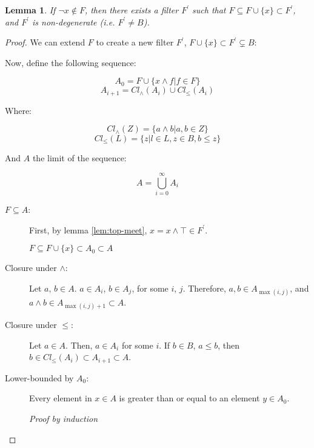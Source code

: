 \documentclass[notitlepage,a4paper]{article}
\newtheorem{lemma}{Lemma}
\begin{document}
\begin{enumerate}
\begin{lemma}
       If $¬x \not \in F$, then there exists a
       filter $F^\prime$ such that $F \subseteq F \cup \{x\} \subset F^\prime$,
       and $F^\prime$ is non-degenerate (i.e. $F^\prime \neq B$).
       
    \end{lemma}
    \begin{proof}
           We can extend $F$ to create a new filter $F^\prime$,
           $F \cup \{x\} \subset F^\prime \subsetneq B$:
           
           Now, define the following sequence:

           $$A_0 = F \cup \{ x ∧ f | f ∈ F \}$$
           $$A_{i+1} = Cl_{∧}(A_i) \cup Cl_{≤}(A_i)$$

           Where:

           $$Cl_{∧}(Z) = \{ a ∧ b  \vert a, b \in Z \}$$
           $$Cl_{≤}(L) = \{ z \vert l \in L, z \in B, b ≤ z \}$$

           And $A$ the limit of the sequence:

           $$A = \bigcup_{i=0}^{\infty} A_i$$

           \begin{description}
             \item[$F \subseteq A$:]

               First, by lemma \ref{lem:top-meet}, $x = x ∧ ⊤ ∈ F^\prime$.

               $F \subseteq F \cup \{x\} \subset A_0 \subset A$
               
             \item[Closure under $∧$:]

               Let $a,\,b \in A$. $a \in A_i$, $b \in A_j$, for some
               $i$, $j$. Therefore,
               $a,b \in A_{\max(i,j)}$, and $a ∧ b \in A_{\max(i,j)+1} \subset A$.

             \item[Closure under $≤$:]
               
               Let $a \in A$. Then, $a \in A_i$ for some $i$. If $b \in B$,
               $a ≤ b$, then $b ∈ Cl_{≤}(A_i) \subset A_{i+1} \subset A$.

             \item[Lower-bounded by $A_0$:]
               
               Every element in $x ∈ A$ is greater than or equal to an element
               $y ∈ A_0$.

               {\em Proof by induction}


\end{description}
\end{proof}
\end{enumerate}
\end{document}

